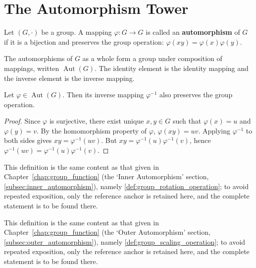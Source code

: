 \section{\texorpdfstring{The Automorphism Tower}{The Automorphism Tower}}
\label{sec:automorphism_tower}

\begin{definition}\label{def:automorphism}
Let $(G,\cdot)$ be a group. A mapping $\varphi: G \to G$ is called an \textbf{automorphism} of $G$ if it is a bijection and preserves the group operation: $\varphi(xy) = \varphi(x)\varphi(y)$.
\end{definition}

\begin{definition}\label{def:automorphism_group}
The automorphisms of $G$ as a whole form a group under composition of mappings, written $\operatorname{Aut}(G)$. The identity element is the identity mapping and the inverse element is the inverse mapping.
\end{definition}

\begin{proposition}\label{prop:automorphism_inverse}
Let $\varphi \in \operatorname{Aut}(G)$. Then its inverse mapping $\varphi^{-1}$ also preserves the group operation.
\end{proposition}

\begin{proof}
Since $\varphi$ is surjective, there exist unique $x, y \in G$ such that $\varphi(x) = u$ and $\varphi(y) = v$. By the homomorphism property of $\varphi$, $\varphi(xy) = uv$. Applying $\varphi^{-1}$ to both sides gives $xy = \varphi^{-1}(uv)$. But $xy = \varphi^{-1}(u)\varphi^{-1}(v)$, hence $\varphi^{-1}(uv) = \varphi^{-1}(u)\varphi^{-1}(v)$.
\end{proof}

\begin{definition}\label{def:inner_automorphism}
This definition is the same content as that given in Chapter~\ref{chap:group_function} (the `Inner Automorphism' section, \cref{subsec:inner_automorphism}), namely \cref{def:group_rotation_operation}; to avoid repeated exposition, only the reference anchor is retained here, and the complete statement is to be found there.
\end{definition}

\begin{definition}\label{def:outer_automorphism}
This definition is the same content as that given in Chapter~\ref{chap:group_function} (the `Outer Automorphism' section, \cref{subsec:outer_automorphism}), namely \cref{def:group_scaling_operation}; to avoid repeated exposition, only the reference anchor is retained here, and the complete statement is to be found there.
\end{definition}

